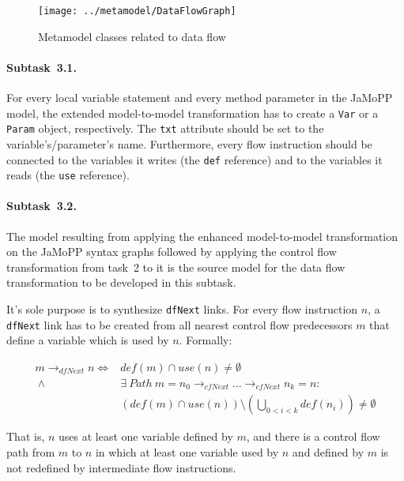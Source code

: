 \documentclass[submission]{eptcs}
\begin{document}
\begin{figure}[h!]
  \centering
  \texttt{[image: ../metamodel/DataFlowGraph]}
  \caption{Metamodel classes related to data flow}
  \label{fig:data-flow-mm}
\end{figure}

\paragraph{Subtask~3.1.}
\label{sec:subtask-3.1}

For every local variable statement and every method parameter in the JaMoPP
model, the extended model-to-model transformation has to create a \verb|Var| or
a \verb|Param| object, respectively.  The \verb|txt| attribute should be set to
the variable's/parameter's name.  Furthermore, every flow instruction should be
connected to the variables it writes (the \verb|def| reference) and to the
variables it reads (the \verb|use| reference).


\paragraph{Subtask~3.2.}
\label{sec:subtask-3.2}

The model resulting from applying the enhanced model-to-model transformation on
the JaMoPP syntax graphs followed by applying the control flow transformation
from task~2 to it is the source model for the data flow transformation to be
developed in this subtask.

It's sole purpose is to synthesize \verb|dfNext| links.  For every flow
instruction $n$, a \verb|dfNext| link has to be created from all nearest
control flow predecessors $m$ that define a variable which is used by $n$.
Formally:

\begin{align*}
  m \rightarrow_{dfNext} n  \iff {} & def(m) \cap use(n) \neq \emptyset\\
  ~\land {} & \exists~Path~m = n_0 \rightarrow_{cfNext} ... \rightarrow_{cfNext} n_k = n:\\
  & \left(def(m) \cap use(n)\right) \setminus \left(\bigcup_{0 < i < k}
    def(n_i)\right) \neq \emptyset
\end{align*}

That is, $n$ uses at least one variable defined by $m$, and there is a control
flow path from $m$ to $n$ in which at least one variable used by $n$ and
defined by $m$ is not redefined by intermediate flow instructions.
\end{document}
